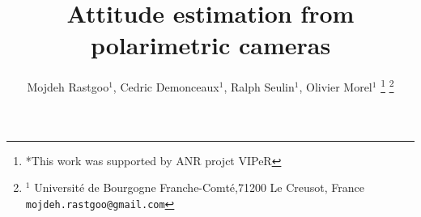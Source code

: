 \title{\LARGE \bf
Attitude estimation from polarimetric cameras}


\author{Mojdeh Rastgoo$^{1}$, Cedric Demonceaux$^{1}$, Ralph Seulin$^{1}$, Olivier Morel$^{1}$  %
\thanks{*This work was supported by ANR projct VIPeR}%
\thanks{$^{1}$ Universit\'e de Bourgogne Franche-Comt\'e,71200 Le Creusot, France
       {\tt\small mojdeh.rastgoo@gmail.com}}
}

